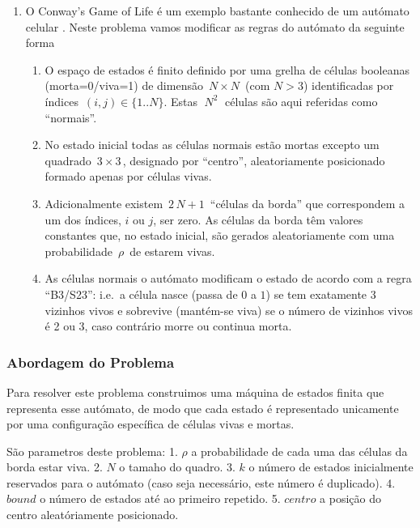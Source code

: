 \documentclass[11pt]{article}
\providecommand{\tightlist}{%
      \setlength{\itemsep}{0pt}\setlength{\parskip}{0pt}}
\begin{document}
    \begin{enumerate}
\def\labelenumi{\arabic{enumi}.}
\setcounter{enumi}{1}
\tightlist
\item
  O Conway's Game of Life é um exemplo bastante conhecido de um autómato
  celular . Neste problema vamos modificar as regras do autómato da
  seguinte forma

  \begin{enumerate}
  \def\labelenumii{\arabic{enumii}.}
  \tightlist
  \item
    O espaço de estados é finito definido por uma grelha de células
    booleanas (morta=0/viva=1) de dimensão \(\,N\times N\,\) (com
    \(N>3\)) identificadas por índices \(\,(i,j)\in \{1..N\}\). Estas
    \(\;N^2\;\) células são aqui referidas como ``normais''.
  \item
    No estado inicial todas as células normais estão mortas excepto um
    quadrado \(\,3\times 3\,\), designado por ``centro'', aleatoriamente
    posicionado formado apenas por células vivas.
  \item
    Adicionalmente existem \(\,2\,N+1\,\) ``células da borda'' que
    correspondem a um dos índices, \(i\) ou \(j\), ser zero. As células
    da borda têm valores constantes que, no estado inicial, são gerados
    aleatoriamente com uma probabilidade \(\,\rho\,\) de estarem vivas.
  \item
    As células normais o autómato modificam o estado de acordo com a
    regra ``B3/S23'': i.e.~a célula nasce (passa de \(0\) a \(1\)) se
    tem exatamente 3 vizinhos vivos e sobrevive (mantém-se viva) se o
    número de vizinhos vivos é 2 ou 3, caso contrário morre ou continua
    morta.
  \end{enumerate}
\end{enumerate}

    \hypertarget{abordagem-do-problema}{%
\subsubsection{Abordagem do Problema}\label{abordagem-do-problema}}

    Para resolver este problema construimos uma máquina de estados finita
que representa esse autómato, de modo que cada estado é representado
unicamente por uma configuração específica de células vivas e mortas.

São parametros deste problema: 1. \(\rho\) a probabilidade de cada uma
das células da borda estar viva. 2. \(N\) o tamaho do quadro. 3. \(k\) o
número de estados inicialmente reservados para o autómato (caso seja
necessário, este número é duplicado). 4. \(bound\) o número de estados
até ao primeiro repetido. 5. \(centro\) a posição do centro
aleatóriamente posicionado.
\end{document}
